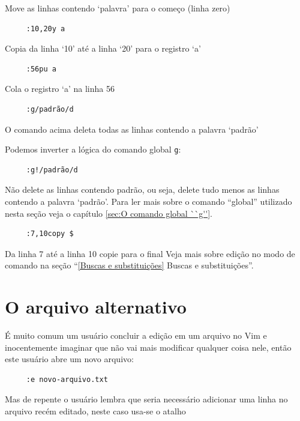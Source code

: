 \documentclass[10pt,a4paper,openany]{book}
\begin{document}
Move as linhas contendo `palavra' para o começo (linha zero)


\begin{verbatim}
     :10,20y a
\end{verbatim}

Copia da linha `10' até a linha `20' para o registro `a'

\begin{verbatim}
     :56pu a
\end{verbatim}

Cola o registro `a' na linha 56

\begin{verbatim}
     :g/padrão/d
\end{verbatim}

O comando acima deleta todas as linhas contendo a palavra `padrão'

Podemos inverter a lógica do comando global \verb+g+:

\begin{verbatim}
     :g!/padrão/d
\end{verbatim}


Não delete as linhas contendo padrão, ou seja, delete tudo menos as linhas
contendo a palavra `padrão'. Para ler mais sobre o comando ``global'' utilizado 
nesta seção veja o capítulo \ref{sec:O comando global ``g''}.

\begin{verbatim}
     :7,10copy $
\end{verbatim}

Da linha 7 até a linha 10 copie para o final
Veja mais sobre edição no modo de comando na seção ``\ref{Buscas e
substituições} Buscas e substituições''.

\section{O arquivo alternativo}
\label{O arquivo alternativo}

É muito comum um usuário concluir a edição em um arquivo no Vim e
inocentemente imaginar que não vai mais modificar qualquer coisa nele, então
este usuário abre um novo arquivo:

\begin{verbatim}
     :e novo-arquivo.txt
\end{verbatim}

Mas de repente o usuário lembra que seria necessário adicionar uma linha no
arquivo recém editado, neste caso usa-se o atalho
\end{document}
